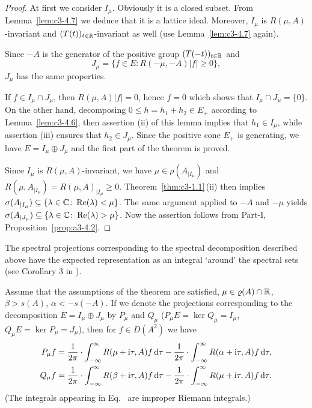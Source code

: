 \begin{proof}
At first we consider $I_{\mu}$. Obviously it is a closed subset.
From Lemma~\ref{lem:c3-4.7} we deduce that it is a lattice ideal. Moreover, $I_{\mu}$
is $R(\mu,A)$-invariant and $(T(t))_{t \in \mathbb{R} }$-invariant as well (use Lemma~\ref{lem:c3-4.7} again).

Since $-A$ is the generator of the positive group $(T(-t))_{t \in \mathbb{R} }$ and
%
\[
	 J_{\mu} = \{f \in E \colon R(-\mu,-A)|f| \geq 0\} ,
\]
%
$J_{\mu}$ has the same properties.

If\/ $f \in I_{\mu} \cap J_{\mu}$, then $R(\mu,A)|f| = 0$, hence $f = 0$ which shows that
$I_{\mu} \cap J_{\mu} = \{0\}$. On the other hand, decomposing $0 \leq h = h_1 + h_2 \in E_+$
according to Lemma~\ref{lem:c3-4.6}, then assertion (ii) of this lemma implies
that $h_1 \in I_{\mu}$, while assertion (iii) ensures that $h_2 \in J_{\mu}$. Since the
positive cone $E_+$ is generating, we have $E = I_{\mu} \oplus J_{\mu}$ and the first part
of the theorem is proved.

Since $I_{\mu}$ is $R(\mu,A)$-invariant, we have $\mu \in \rho(A_{|I_{\mu}})$ and
$R(\mu,A_{|I_{\mu}}) = R(\mu,A)_{|I_{\mu}} \geq 0$. Theorem~\ref{thm:c3-1.1}\,(ii) then implies
$\sigma(A_{\vert I_{\mu}}) \subseteq \{\lambda \in \mathbb{C}  \colon \mathop{}\!\mathrm{Re}(\lambda) < \mu\}$. The same argument applied to $-A$ and
$-\mu$ yields $\sigma(A_{|J_{\mu}}) \subseteq \{\lambda \in \mathbb{C}  \colon \mathop{}\!\mathrm{Re}(\lambda) > \mu\}$. 
Now the assertion follows
from Part-I, Proposition~\ref{prop:a3-4.2}.
\end{proof}
The spectral projections corresponding to the spectral decomposition
described above have the expected representation as an integral
\enquote*{around} the spectral sets (see Corollary 3 in \textcite{greiner:1984c}).
\begin{corollary}\label{cor:c3-4.9}
Assume that the assumptions of the theorem are satisfied, $\mu \in \rho(A) \cap \R $, $\beta > s(A)$, $\alpha < -s(-A)$. 
If we denote the projections corresponding to the decomposition $E = I_{\mu} \oplus J_{\mu}$ by $P_{\mu}$ and $Q_{\mu}$
(\ie  $P_{\mu}E = \ker Q_{\mu} = I_{\mu}$, $Q_{\mu}E = \ker P_{\mu} = J_{\mu}$), then for $f \in D(A^2)$ we
have
\begin{equation}\label{eq:c3-4.10}
\begin{split}
	P_{\mu}f &= \frac{1}{2\pi} \cdot \int_{-\infty}^{\infty} R(\mu+\mathrm{i}\tau,A)f \mathop{}\!\mathrm{d}{\tau} - \frac{1}{2\pi} \cdot \int_{-\infty}^{\infty} R(\alpha+\mathrm{i}\tau,A)f \mathop{}\!\mathrm{d}{\tau} ,\\
	Q_{\mu}f &= \frac{1}{2\pi} \cdot \int_{-\infty}^{\infty} R(\beta+\mathrm{i}\tau,A)f \mathop{}\!\mathrm{d}{\tau} - \frac{1}{2\pi} \cdot \int_{-\infty}^{\infty} R(\mu+\mathrm{i}\tau,A)f \mathop{}\!\mathrm{d}{\tau} .
\end{split}
\end{equation}
(The integrals appearing in Eq.~ are improper Riemann integrals.)
\end{corollary}
